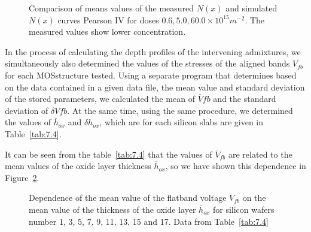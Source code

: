 \begin{figure}[h!]\centering
  \begin{minipage}[c]{\myfiguresize}
    \begin{center}
      
    \end{center}
    \caption[Comparison of the mean values of the measured curves
      $N(x)$ and simulated using the Pearson IV method]{Comparison of
      means values of the measured $N(x)$ and simulated $N(x)$ curves
      Pearson IV for doses $0.6, 5.0, 60.0 \times 10^{15} m^{-2}$. The
      measured values show lower concentration.}\label{fig:7.5}
  \end{minipage}
\end{figure}

In the process of calculating the depth profiles of the intervening
admixtures, we simultaneously also determined the values of the
stresses of the aligned bands $V_{fb}$ for each MOS\@ structure
tested. Using a separate program that determines based on the data
contained in a given data file, the mean value and standard deviation
of the stored parameters, we calculated the mean of $\overline V{fb}$
and the standard deviation of $\delta V{fb}$. At the same time, using
the same procedure, we determined the values of $\overline h_{ox}$ and
$\delta h_{ox}$, which are for each silicon slabs are given in
Table~\ref{tab:7.4}.

It can be seen from the table~\ref{tab:7.4} that the values of
$\overline V_{fb}$ are related to the mean values of the oxide layer
thickness $\overline h_{ox}$, so we have shown this dependence in
Figure~\ref{fig:7.6}.

\newpage
\begin{figure}[h!]
  \begin{minipage}[c]{\myfiguresize}
    \begin{center}
      
    \end{center}
    \caption[Dependence of the mean value of $\overline V_{fb}$ on the
      mean value of the oxide layer thickness $\overline
      h_{ox}$]{Dependence of the mean value of the flatband voltage
      $\overline V_{fb}$ on the mean value of the thickness of the
      oxide layer $\overline h_{ox}$ for silicon wafers number 1, 3,
      5, 7, 9, 11, 13, 15 and 17. Data from
      Table~\ref{tab:7.4}}\label{fig:7.6}
  \end{minipage}
\end{figure}

